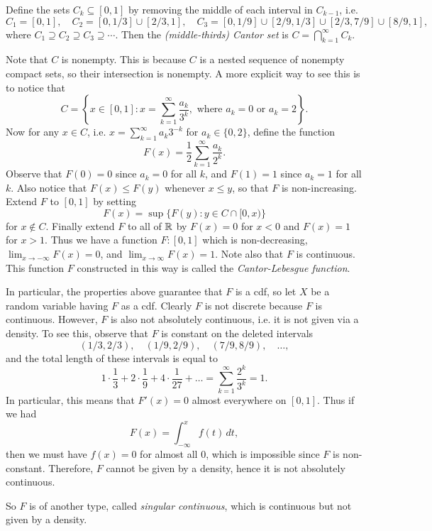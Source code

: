 \begin{definition}
  Define the sets $C_k \subseteq [0, 1]$ by removing
  the middle of each interval in $C_{k - 1}$, i.e.
  \[
    C_1 = [0, 1], \quad
    C_2 = [0, 1 / 3] \cup [2 / 3, 1], \quad
    C_3 = [0, 1 / 9] \cup [2 / 9, 1 / 3] \cup [2 / 3, 7 / 9] \cup [8 / 9, 1],
  \]
  where $C_1 \supseteq C_2 \supseteq C_3 \supseteq \cdots$.
  Then the \emph{(middle-thirds) Cantor set} is
  $C = \bigcap_{k = 1}^\infty C_k$.
\end{definition}

\begin{remark}
  Note that $C$ is nonempty. This is because $C$ is
  a nested sequence of nonempty compact sets, so
  their intersection is nonempty. A more
  explicit way to see this is to notice that
  \[
    C = \left\{
      x \in [0, 1] : x = \sum_{k = 1}^\infty \frac{a_k}{3^k}, \text{ where } a_k = 0 \text{ or } a_k = 2
    \right\}.
  \]
  Now for any $x \in C$, i.e. $x = \sum_{k = 1}^\infty a_k 3^{-k}$ for $a_k \in \{0, 2\}$,
  define the function
  \[
    F(x)  = \frac{1}{2} \sum_{k = 1}^\infty \frac{a_k}{2^k}.
  \]
  Observe that $F(0) = 0$ since
  $a_k = 0$ for all $k$, and $F(1) = 1$ since
  $a_k = 1$ for all $k$. Also notice that
  $F(x) \le F(y)$ whenever $x \le y$, so that
  $F$ is non-increasing. Extend $F$ to $[0, 1]$
  by setting
  \[
    F(x) = \sup\{F(y) : y \in C \cap [0, x)\}
  \]
  for $x \notin C$. Finally extend $F$ to
  all of $\mathbb{R}$ by $F(x) = 0$ for $x < 0$ and
  $F(x) = 1$ for $x > 1$. Thus we have a function
  $F : [0, 1]$ which is non-decreasing,
  $\lim_{x \to -\infty} F(x) = 0$, and
  $\lim_{x \to \infty} F(x) = 1$. Note also that
  $F$ is continuous. This function $F$
  constructed in this way is called the
  \emph{Cantor-Lebesgue function}.

  In particular, the properties above guarantee
  that $F$ is a cdf, so let $X$ be a random
  variable having $F$ as a cdf. Clearly $F$ is
  not discrete because $F$ is continuous.
  However, $F$ is also not absolutely continuous, i.e.
  it is not given via a density. To see this,
  observe that $F$ is constant on the deleted intervals
  \[
    (1 / 3, 2 / 3), \quad
    (1 / 9, 2 / 9), \quad
    (7 / 9, 8 / 9), \quad \ldots,
  \]
  and the total length of these intervals is equal to
  \[
    1 \cdot \frac{1}{3} + 2 \cdot \frac{1}{9}
    + 4 \cdot \frac{1}{27}
    + \dots = \sum_{k = 1}^\infty \frac{2^k}{3^k} = 1.
  \]
  In particular, this means that
  $F'(x) = 0$ almost everywhere on $[0, 1]$. Thus
  if we had
  \[
    F(x)
    = \int_{-\infty}^x f(t) \, dt,
  \]
  then we must have $f(x) = 0$ for almost all
  $0$, which is impossible since
  $F$ is non-constant. Therefore, $F$ cannot be
  given by a density, hence it is not absolutely
  continuous.

  So $F$ is of another type, called \emph{singular
  continuous}, which is continuous but
  not given by a density.
\end{remark}
